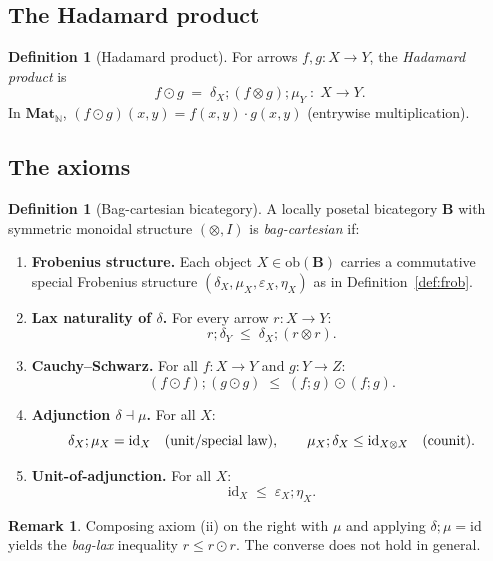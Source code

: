 \documentclass[11pt,a4paper]{article}
\theoremstyle{definition}
\newtheorem{definition}[theorem]{Definition}
\newtheorem{remark}[theorem]{Remark}
\newcommand{\Had}{\odot}
\newcommand{\Mat}{\mathbf{Mat}}
\newcommand{\N}{\mathbb{N}}
\newcommand{\id}{\mathrm{id}}
\newcommand{\ob}{\mathrm{ob}}
\begin{document}
\subsection{The Hadamard product}

\begin{definition}[Hadamard product]\label{def:hadamard}
For arrows $f, g \colon X \to Y$, the \emph{Hadamard product} is
\[
  f \Had g \;=\; \delta_X;(f \otimes g);\mu_Y \;\colon\; X \to Y.
\]
In $\Mat_\N$, $(f \Had g)(x,y) = f(x,y) \cdot g(x,y)$ \textup{(entrywise multiplication)}.
\end{definition}

\subsection{The axioms}

\begin{definition}[Bag-cartesian bicategory]\label{def:bag-cart}
A locally posetal bicategory $\mathbf{B}$ with symmetric monoidal structure $(\otimes, I)$ is \emph{bag-cartesian} if:
\begin{enumerate}[label=\textbf{(\roman*)},leftmargin=2.5em]
  \item \textbf{Frobenius structure.} Each object $X \in \ob(\mathbf{B})$ carries a commutative special Frobenius structure $(\delta_X, \mu_X, \varepsilon_X, \eta_X)$ as in Definition~\ref{def:frob}.

  \item \textbf{Lax naturality of $\delta$.} For every arrow $r \colon X \to Y$:
  \[
    r;\delta_Y \;\leq\; \delta_X;(r \otimes r).
  \]

  \item \textbf{Cauchy--Schwarz.} For all $f \colon X \to Y$ and $g \colon Y \to Z$:
  \[
    (f \Had f);(g \Had g) \;\leq\; (f;g) \Had (f;g).
  \]

  \item \textbf{Adjunction $\delta \dashv \mu$.} For all $X$:
  \[
    \delta_X;\mu_X = \id_X \quad \textup{(unit/special law)}, \qquad
    \mu_X;\delta_X \leq \id_{X \otimes X} \quad \textup{(counit)}.
  \]

  \item \textbf{Unit-of-adjunction.} For all $X$:
  \[
    \id_X \;\leq\; \varepsilon_X;\eta_X.
  \]
\end{enumerate}
\end{definition}

\begin{remark}\label{rmk:bag-lax}
Composing axiom (ii) on the right with $\mu$ and applying $\delta;\mu = \id$ yields the \emph{bag-lax} inequality $r \leq r \Had r$. The converse does not hold in general.
\end{remark}
\end{document}
